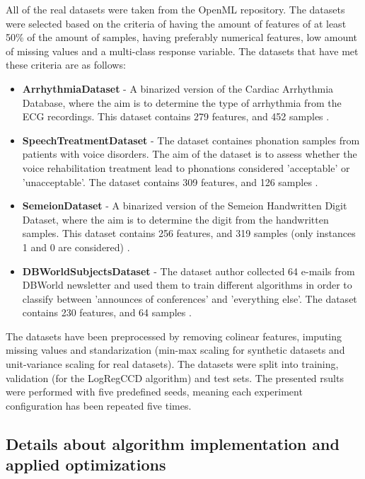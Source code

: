 \documentclass[11pt]{article}
\begin{document}
All of the real datasets were taken from the OpenML \cite{OpenML2013} repository. The datasets were selected based on the criteria of having the amount of features of at least 50\% of the amount of samples, having preferably numerical features, low amount of missing values and a multi-class response variable. The datasets that have met these criteria are as follows:
\begin{itemize}
    \item \textbf{ArrhythmiaDataset} - A binarized version of the Cardiac Arrhythmia Database, where the aim is to determine the type of arrhythmia from the ECG recordings. This dataset contains 279 features, and 452 samples \cite{arrhythmia_5}.
    \item \textbf{SpeechTreatmentDataset} - The dataset containes phonation samples from patients with voice disorders. The aim of the dataset is to assess whether the voice rehabilitation treatment lead to phonations considered 'acceptable' or 'unacceptable'. The dataset contains 309 features, and 126 samples \cite{lsvt_voice_rehabilitation_282}.
    
    \item \textbf{SemeionDataset} - A binarized version of the Semeion Handwritten Digit Dataset, where the aim is to determine the digit from the handwritten samples. This dataset contains 256 features, and 319 samples (only instances 1 and 0 are considered) \cite{semeion_handwritten_digit_178}.
    \item \textbf{DBWorldSubjectsDataset} - The dataset author collected 64 e-mails from DBWorld newsletter and used them to train different algorithms in order to classify between 'announces of conferences' and 'everything else'. The dataset contains 230 features, and 64 samples \cite{dbworld_e-mails_219}.

\end{itemize}

The datasets have been preprocessed by removing colinear features, imputing missing values and standarization (min-max scaling for synthetic datasets and unit-variance scaling for real datasets). The datasets were split into training, validation (for the LogRegCCD algorithm) and test sets. The presented rsults were performed with five predefined seeds, meaning each experiment configuration has been repeated five times.


\subsection{Details about algorithm implementation and applied optimizations}
\end{document}
